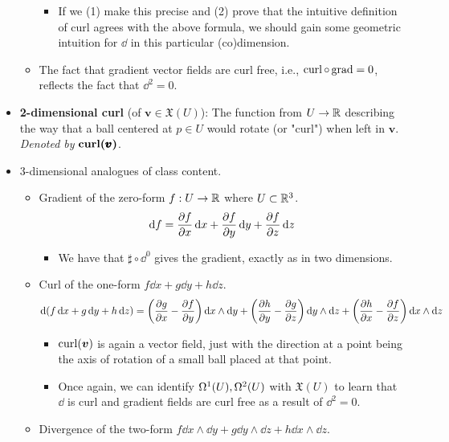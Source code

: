 \documentclass[../notes.tex]{subfiles}
\begin{document}
\begin{itemize}
\begin{itemize}
\begin{itemize}
            \item If we (1) make this precise and (2) prove that the intuitive definition of curl agrees with the above formula, we should gain some geometric intuition for $\dd$ in this particular (co)dimension.
        \end{itemize}
        \item The fact that gradient vector fields are curl free, i.e., $\crl\circ\grd=0$, reflects the fact that $\dd^2=0$.
    \end{itemize}
    \item \textbf{2-dimensional curl} (of $\bm{v}\in\mathfrak{X}(U)$): The function from $U\to\R$ describing the way that a ball centered at $p\in U$ would rotate (or "curl") when left in $\bm{v}$. \emph{Denoted by} $\bm{\crl(\pmb{v})}$.
    \item 3-dimensional analogues of class content.
    \begin{itemize}
        \item Gradient of the zero-form $f:U\to\R$ where $U\subset\R^3$.
        \begin{equation*}
            \dd f = \pdv{f}{x}\dd{x}+\pdv{f}{y}\dd{y}+\pdv{f}{z}\dd{z}
        \end{equation*}
        \begin{itemize}
            \item We have that $\sharp\circ\dd^0$ gives the gradient, exactly as in two dimensions.
        \end{itemize}
        \item Curl of the one-form $f\dd{x}+g\dd{y}+h\dd{z}$.
        \begin{equation*}
            \dd(f\dd{x}+g\dd{y}+h\dd{z}) = \left( \pdv{g}{x}-\pdv{f}{y} \right)\dd{x}\wedge\dd{y}+\left( \pdv{h}{y}-\pdv{g}{z} \right)\dd{y}\wedge\dd{z}+\left( \pdv{h}{x}-\pdv{f}{z} \right)\dd{x}\wedge\dd{z}
        \end{equation*}
        \begin{itemize}
            \item $\crl(\bm{v})$ is again a vector field, just with the direction at a point being the axis of rotation of a small ball placed at that point.
            \item Once again, we can identify $\ome[1]{U},\ome[2]{U}$ with $\mathfrak{X}(U)$ to learn that $\dd$ is curl and gradient fields are curl free as a result of $\dd^2=0$.
        \end{itemize}
        \item Divergence of the two-form $f\dd{x}\wedge\dd{y}+g\dd{y}\wedge\dd{z}+h\dd{x}\wedge\dd{z}$.

\end{itemize}
\end{itemize}
\end{document}
